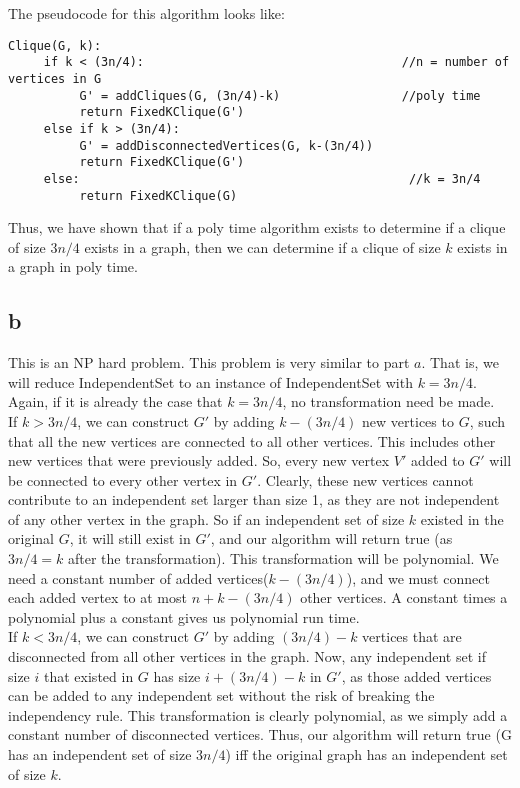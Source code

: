 \documentclass[letterpaper,notitlepage,twoside]{article}
\begin{document}
The pseudocode for this algorithm looks like:
\begin{verbatim}
Clique(G, k):
     if k < (3n/4):                                    //n = number of vertices in G
          G' = addCliques(G, (3n/4)-k)                 //poly time
          return FixedKClique(G')        
     else if k > (3n/4):
          G' = addDisconnectedVertices(G, k-(3n/4))  
          return FixedKClique(G')
     else:                                              //k = 3n/4
          return FixedKClique(G)         
\end{verbatim}
Thus, we have shown that if a poly time algorithm exists to determine if a clique of size $3n/4$ exists in a graph, then we can determine if a clique of size $k$ exists in a graph in poly time. 
\subsection*{b}
This is an NP hard problem. This problem is very similar to part $a$. That is, we will reduce IndependentSet to an instance of IndependentSet with $k=3n/4$. Again, if it is already the case that $k=3n/4$, no transformation need be made. \\
If $k>3n/4$, we can construct $G'$ by adding $k-(3n/4)$ new vertices to $G$, such that all the new vertices are connected to all other vertices. This includes other new vertices that were previously added. So, every new vertex $V'$ added to $G'$ will be connected to every other vertex in $G'$. Clearly, these new vertices cannot contribute to an independent set larger than size 1, as they are not independent of any other vertex in the graph. So if an independent set of size $k$ existed in the original $G$, it will still exist in $G'$, and our algorithm will return true (as $3n/4=k$ after the transformation). This transformation will be polynomial. We need a constant number of added vertices($k-(3n/4)$), and we must connect each added vertex to at most $n+k-(3n/4)$ other vertices. A constant times a polynomial plus a constant gives us polynomial run time.\\
If $k<3n/4$, we can construct $G'$ by adding $(3n/4) - k$ vertices that are disconnected from all other vertices in the graph. Now, any independent set if size $i$ that existed in $G$ has size $i +  (3n/4) - k$ in $G'$, as those added vertices can be added to any independent set without the risk of breaking the independency rule. This transformation is clearly polynomial, as we simply add a constant number of disconnected vertices. Thus, our algorithm will return true (G has an independent set of size $3n/4$) iff the original graph has an independent set of size $k$. \\
\end{document}
